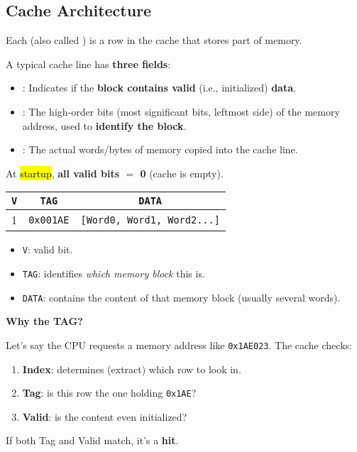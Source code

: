 \subsection{Cache Architecture}

Each  (also called ) is a row in the cache that stores part of memory.

\highspace
A typical cache line has \textbf{three fields}:
\begin{itemize}
    \item {}: Indicates if the \textbf{block contains valid} (i.e., initialized) \textbf{data}.
    \item {}: The high-order bits (most significant bits, leftmost side) of the memory address, used to \textbf{identify the block}.
    \item {}: The actual words/bytes of memory copied into the cache line.
\end{itemize}
At \hl{startup}, \textbf{all valid bits $=$ 0} (cache is empty).

\begin{examplebox}
    \begin{center}
        \begin{tabular}{@{} c | c | c @{}}
            \toprule
            \texttt{V} & \texttt{TAG} & \texttt{DATA} \\
            \midrule
            1 & \texttt{0x001AE} & \texttt{[Word0, Word1, Word2...]} \\
            \bottomrule
        \end{tabular}
    \end{center}
    \begin{itemize}
        \item \texttt{V}: valid bit.
        \item \texttt{TAG}: identifies \emph{which memory block} this is.
        \item \texttt{DATA}: contains the content of that memory block (usually several words).
    \end{itemize}
\end{examplebox}

\highspace
\begin{flushleft}
    \textcolor{Green3}{ \textbf{Why the TAG?}}
\end{flushleft}
Let's say the CPU requests a memory address like \texttt{0x1AE023}. The cache checks:
\begin{enumerate}
    \item \textbf{Index}: determines (extract) which row to look in.
    \item \textbf{Tag}: is this row the one holding \texttt{0x1AE}?
    \item \textbf{Valid}: is the content even initialized?
\end{enumerate}
If both Tag and Valid match, it's a \textbf{hit}.

